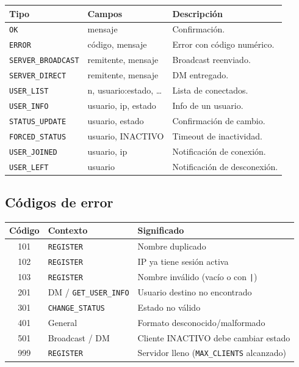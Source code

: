 \documentclass[12pt,a4paper]{article}
\begin{document}
\begin{center}
\begin{tabular}{llp{6cm}}
\toprule
\textbf{Tipo} & \textbf{Campos} & \textbf{Descripción} \\
\midrule
\texttt{OK}               & mensaje                & Confirmación. \\
\texttt{ERROR}            & código, mensaje         & Error con código numérico. \\
\texttt{SERVER\_BROADCAST} & remitente, mensaje      & Broadcast reenviado. \\
\texttt{SERVER\_DIRECT}   & remitente, mensaje       & DM entregado. \\
\texttt{USER\_LIST}       & n, usuario:estado, \ldots & Lista de conectados. \\
\texttt{USER\_INFO}       & usuario, ip, estado      & Info de un usuario. \\
\texttt{STATUS\_UPDATE}   & usuario, estado          & Confirmación de cambio. \\
\texttt{FORCED\_STATUS}   & usuario, INACTIVO        & Timeout de inactividad. \\
\texttt{USER\_JOINED}     & usuario, ip              & Notificación de conexión. \\
\texttt{USER\_LEFT}       & usuario                  & Notificación de desconexión. \\
\bottomrule
\end{tabular}
\end{center}

\subsection{Códigos de error}

\begin{center}
\begin{tabular}{cll}
\toprule
\textbf{Código} & \textbf{Contexto} & \textbf{Significado} \\
\midrule
101 & \texttt{REGISTER}       & Nombre duplicado \\
102 & \texttt{REGISTER}       & IP ya tiene sesión activa \\
103 & \texttt{REGISTER}       & Nombre inválido (vacío o con \texttt{|}) \\
201 & DM / \texttt{GET\_USER\_INFO} & Usuario destino no encontrado \\
301 & \texttt{CHANGE\_STATUS} & Estado no válido \\
401 & General                 & Formato desconocido/malformado \\
501 & Broadcast / DM          & Cliente INACTIVO debe cambiar estado \\
999 & \texttt{REGISTER}       & Servidor lleno (\texttt{MAX\_CLIENTS} alcanzado) \\
\bottomrule
\end{tabular}
\end{center}
\end{document}
